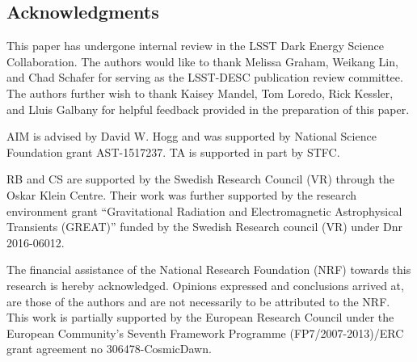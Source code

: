 \documentclass[\docopts]{\docclass}
\begin{document}













\subsection*{Acknowledgments}




This paper has undergone internal review in the LSST Dark Energy Science Collaboration. %
The authors would like to thank Melissa Graham, Weikang Lin, and Chad Schafer for serving as the LSST-DESC publication review committee.
The authors further wish to thank Kaisey Mandel, Tom Loredo, Rick Kessler, and Lluis Galbany for helpful feedback provided in the preparation of this paper.

AIM is advised by David W. Hogg and was supported by National Science Foundation grant AST-1517237.
TA is supported in part by STFC.

RB and CS are supported by the Swedish Research Council (VR) through the Oskar Klein Centre.
Their work was further supported by the research environment grant ``Gravitational Radiation and Electromagnetic Astrophysical Transients (GREAT)'' funded by the Swedish Research council (VR) under Dnr 2016-06012.

The financial assistance of the National Research Foundation (NRF) towards this research is hereby acknowledged.
Opinions expressed and conclusions arrived at, are those of the authors and are not necessarily to be attributed to the NRF.
This work is partially supported by the European Research Council under the European Community’s Seventh Framework Programme (FP7/2007-2013)/ERC grant agreement no 306478-CosmicDawn.
\end{document}
